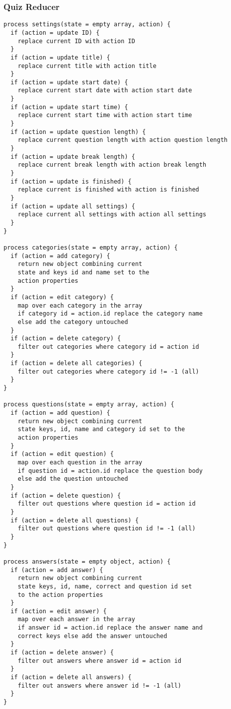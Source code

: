 \subsubsection{Quiz Reducer} %
\label{ssub:quiz_reducer}
\begin{verbatim}
process settings(state = empty array, action) {
  if (action = update ID) {
    replace current ID with action ID
  }
  if (action = update title) {
    replace current title with action title
  }
  if (action = update start date) {
    replace current start date with action start date
  }
  if (action = update start time) {
    replace current start time with action start time
  }
  if (action = update question length) {
    replace current question length with action question length
  }
  if (action = update break length) {
    replace current break length with action break length
  }
  if (action = update is finished) {
    replace current is finished with action is finished
  }
  if (action = update all settings) {
    replace current all settings with action all settings
  }
}

process categories(state = empty array, action) {
  if (action = add category) {
    return new object combining current
    state and keys id and name set to the
    action properties
  }
  if (action = edit category) {
    map over each category in the array
    if category id = action.id replace the category name
    else add the category untouched
  }
  if (action = delete category) {
    filter out categories where category id = action id
  }
  if (action = delete all categories) {
    filter out categories where category id != -1 (all)
  }
}

process questions(state = empty array, action) {
  if (action = add question) {
    return new object combining current
    state keys, id, name and category id set to the
    action properties
  }
  if (action = edit question) {
    map over each question in the array
    if question id = action.id replace the question body
    else add the question untouched
  }
  if (action = delete question) {
    filter out questions where question id = action id
  }
  if (action = delete all questions) {
    filter out questions where question id != -1 (all)
  }
}

process answers(state = empty object, action) {
  if (action = add answer) {
    return new object combining current
    state keys, id, name, correct and question id set
    to the action properties
  }
  if (action = edit answer) {
    map over each answer in the array
    if answer id = action.id replace the answer name and
    correct keys else add the answer untouched
  }
  if (action = delete answer) {
    filter out answers where answer id = action id
  }
  if (action = delete all answers) {
    filter out answers where answer id != -1 (all)
  }
}
\end{verbatim}

